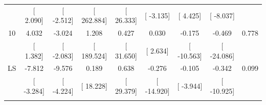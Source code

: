 \documentclass[16pt]{article}
\begin{document}
\begin{table}[!htbp]
\begin{tabular}{@{\extracolsep{5pt}} ccccccccc}
 & [ 2.090] & [ -2.512] & [ 262.884] & [ 26.333] & [ -3.135] & [ 4.425] & [ -8.037] &  \\ 
10 & 4.032 & -3.024 & 1.208 & 0.427 & 0.030 & -0.175 & -0.469 & 0.778 \\ 
 & [ 1.382] & [ -2.083] & [ 189.524] & [ 31.650] & [ 2.634] & [ -10.563] & [ -24.086] &  \\ 
LS & -7.812 & -9.576 & 0.189 & 0.638 & -0.276 & -0.105 & -0.342 & 0.099 \\ 
 & [ -3.284] & [ -4.224] & [ 18.228] & [ 29.379] & [ -14.920] & [ -3.944] & [ -10.925] &  \\ 
\hline \\[-1.8ex] 
\end{tabular} 
\end{table}
\end{document}
